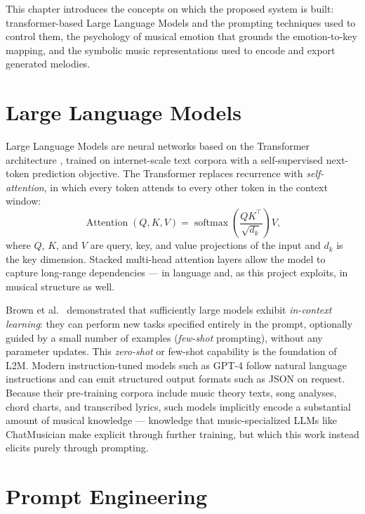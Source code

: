 This chapter introduces the concepts on which the proposed system is built:
transformer-based Large Language Models and the prompting techniques used to
control them, the psychology of musical emotion that grounds the
emotion-to-key mapping, and the symbolic music representations used to encode
and export generated melodies.

\section{Large Language Models}
\label{sec:bg-llm}

Large Language Models are neural networks based on the Transformer
architecture \cite{vaswani17attention}, trained on internet-scale text
corpora with a self-supervised next-token prediction objective. The
Transformer replaces recurrence with \emph{self-attention}, in which every
token attends to every other token in the context window:
\begin{equation}
    \operatorname{Attention}(Q, K, V) =
    \operatorname{softmax}\!\left(\frac{QK^{\top}}{\sqrt{d_k}}\right)V,
\label{eq:attention}
\end{equation}
where $Q$, $K$, and $V$ are query, key, and value projections of the input
and $d_k$ is the key dimension. Stacked multi-head attention layers allow
the model to capture long-range dependencies --- in language and, as this
project exploits, in musical structure as well.

Brown et al.~\cite{brown20fewshot} demonstrated that sufficiently large
models exhibit \emph{in-context learning}: they can perform new tasks
specified entirely in the prompt, optionally guided by a small number of
examples (\emph{few-shot} prompting), without any parameter updates. This
\emph{zero-shot} or few-shot capability is the foundation of L2M. Modern
instruction-tuned models such as GPT-4 \cite{openai24gpt4} follow natural
language instructions and can emit structured output formats such as JSON on
request. Because their pre-training corpora include music theory texts, song
analyses, chord charts, and transcribed lyrics, such models implicitly
encode a substantial amount of musical knowledge --- knowledge that
music-specialized LLMs like ChatMusician \cite{yuan24chatmusician} make
explicit through further training, but which this work instead elicits
purely through prompting.

\section{Prompt Engineering}
\label{sec:bg-prompting}

